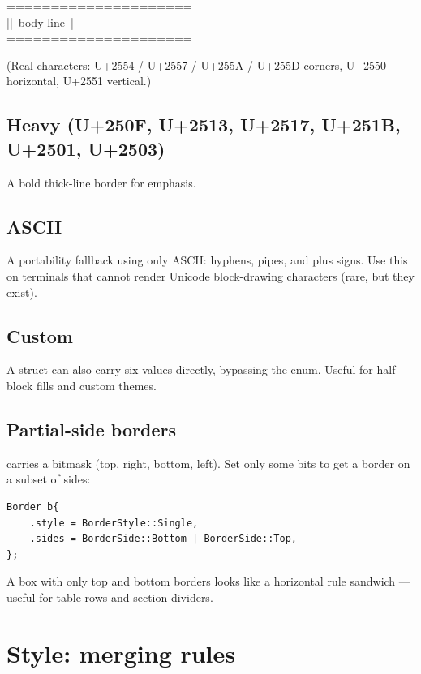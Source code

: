 \begin{terminalbox}
=====================\\
||\, body line\, ||\\
=====================
\end{terminalbox}

(Real characters: U+2554 / U+2557 / U+255A / U+255D corners,
U+2550 horizontal, U+2551 vertical.)

\subsection*{Heavy (U+250F, U+2513, U+2517, U+251B, U+2501, U+2503)}

A bold thick-line border for emphasis.

\subsection*{ASCII}

A portability fallback using only ASCII: hyphens, pipes, and
plus signs. Use this on terminals that cannot render Unicode
block-drawing characters (rare, but they exist).

\subsection*{Custom}

A  struct can also carry six 
values directly, bypassing the enum. Useful for half-block fills
and custom themes.

\subsection*{Partial-side borders}

 carries a  bitmask (top, right, bottom,
left). Set only some bits to get a border on a subset of sides:

\begin{lstlisting}
Border b{
    .style = BorderStyle::Single,
    .sides = BorderSide::Bottom | BorderSide::Top,
};
\end{lstlisting}

A box with only top and bottom borders looks like a horizontal
rule sandwich --- useful for table rows and section dividers.

\section{Style: merging rules}

